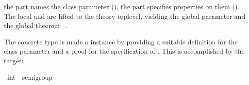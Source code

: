 \begin{isabellebody}
\begin{isamarkuptext}
  the  part names the class parameter (\hyperlink{element.fixes}{\mbox{}}), the  part specifies properties on them
  (\hyperlink{element.assumes}{\mbox{}}).  The local \hyperlink{element.fixes}{\mbox{}} and \hyperlink{element.assumes}{\mbox{}} are lifted to the theory toplevel, yielding the global
  parameter  and the
  global theorem \hyperlink{fact.semigroup.assoc:}{\mbox{}}~.%
\end{isamarkuptext}%
\isamarkuptrue%
%
\isamarkuptrue%
%
\begin{isamarkuptext}%
The concrete type  is made a  instance
  by providing a suitable definition for the class parameter  and a proof for the specification of \hyperlink{fact.assoc}{\mbox{}}.  This is
  accomplished by the \hyperlink{command.instantiation}{\mbox{}} target:%
\end{isamarkuptext}%
\isamarkuptrue%
%
\isadelimquote
%
\endisadelimquote
%
\isatagquote
{}\isamarkupfalse%
\ int\ {}{}\ semigroup\isanewline

\end{isabellebody}
